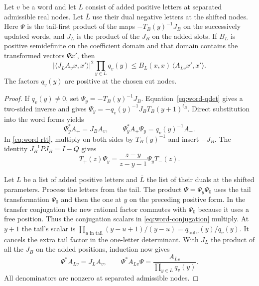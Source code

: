 \begin{proposition}
Let \(v\) be a word and let \(L\) consist of added positive
letters at separated admissible real nodes. Let \(\bar L\)
use their dual negative letters at the shifted nodes.
Here \(\Psi\) is the tail-first product of the maps
\(-T_B(y)^{-1}J_B\) on the successively updated words, and
\(J_L\) is the product of the \(J_B\) on the added slots.
If \(B_L\) is positive semidefinite on the coefficient domain
and that domain contains the transformed vectors \(\Psi x'\),
then
\[
 \big|\langle J_L A_v x,x'\rangle\big|^2
     \prod_{y\in L}q_v(y)
 \le B_L(x,x)\,\langle A_{\bar L v}x',x'\rangle .
\]
The factors \(q_v(y)\) are positive at the chosen cut nodes.
\end{proposition}

\begin{proof}
If \(q_v(y)\ne0\), set \(\Psi_y=-T_B(y)^{-1}J_B\).
Equation~\eqref{eq:word-qdet} gives a two-sided inverse and gives
\(\Psi_y=-q_v(y)^{-1}J_BT_B(y+1)^{t_B}\). Direct substitution
into the word forms yields
\[
 \Psi_y^* A_+ = J_B A_v,\qquad
 \Psi_y^* A_+ \Psi_y = q_v(y)^{-1}A_-.
\]
In \eqref{eq:word-rtt}, multiply on both sides by \(T_B(y)^{-1}\)
and insert \(-J_B\). The identity \(J_B^{-1}P J_B=I-Q\) gives
\begin{equation}\label{eq:word-conjugation}
 T_+(z)\Psi_y=\frac{z-y}{z-y-1}\Psi_y T_-(z).
\end{equation}


Let \(L\) be a list of added positive letters and \(\bar L\)
the list of their duals at the shifted parameters. Process
the letters from the tail. The product \(\Psi=\Psi_y\Psi_0\)
uses the tail transformation \(\Psi_0\) and then the one at
\(y\) on the preceding positive form. In the transfer
conjugation the new rational factor commutes with \(\Psi_0\)
because it uses a free position. Thus the conjugation
scalars in \eqref{eq:word-conjugation} multiply. At \(y+1\)
the tail's scalar is
\(\prod_{u\text{ in tail}}(y-u+1)/(y-u)=q_{\mathrm{tail}\,v}(y)/q_v(y)\).
It cancels the extra tail factor in the one-letter determinant.
With \(J_L\) the product of all the \(J_B\) on the added
positions, induction now gives
\[
 \Psi^*A_{Lv}=J_L A_v,\qquad
 \Psi^*A_{Lv}\Psi=\frac{A_{\bar L v}}{\prod_{y\in L}q_v(y)} .
\]
All denominators are nonzero at separated admissible nodes.



\end{proof}
